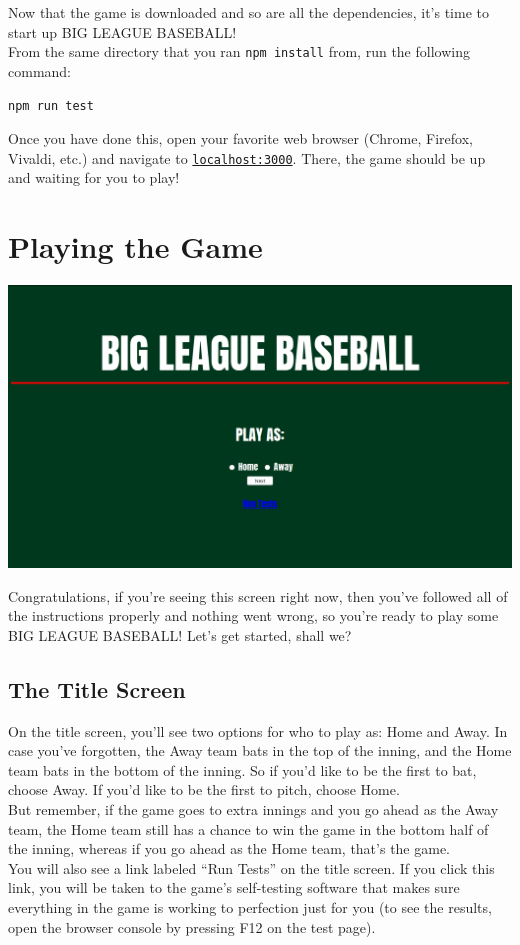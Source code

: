 \documentclass[12pt,a4paper]{report}
\begin{document}
Now that the game is downloaded and so are all the dependencies, it's time to start up BIG LEAGUE BASEBALL!\\
From the same directory that you ran \texttt{npm install} from, run the following command:
\begin{displayquote}
	\texttt{npm run test}
\end{displayquote}
Once you have done this, open your favorite web browser (Chrome, Firefox, Vivaldi, etc.) and navigate to \href{http://localhost:3000}{\texttt{localhost:3000}}. There, the game should be up and waiting for you to play!

\chapter{Playing the Game}
\begin{center}
	\includegraphics[width=1\linewidth]{umInclude/start}
\end{center}
Congratulations, if you're seeing this screen right now, then you've followed all of the instructions properly and nothing went wrong, so you're ready to play some BIG LEAGUE BASEBALL! Let's get started, shall we?

\section{The Title Screen}
On the title screen, you'll see two options for who to play as: Home and Away. In case you've forgotten, the Away team bats in the top of the inning, and the Home team bats in the bottom of the inning. So if you'd like to be the first to bat, choose Away. If you'd like to be the first to pitch, choose Home.\\
But remember, if the game goes to extra innings and you go ahead as the Away team, the Home team still has a chance to win the game in the bottom half of the inning, whereas if you go ahead as the Home team, that's the game.\\
You will also see a link labeled ``Run Tests'' on the title screen. If you click this link, you will be taken to the game's self-testing software that makes sure everything in the game is working to perfection just for you (to see the results, open the browser console by pressing F12 on the test page).
\end{document}
